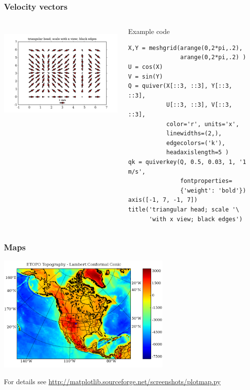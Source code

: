 \documentclass[14pt,compress]{beamer}
\newcounter{time}
\newcommand{\inctime}[1]{\addtocounter{time}{#1}{\tiny \thetime\ m}}
\begin{document}
\begin{frame}[fragile] \frametitle{Velocity vectors}
  \begin{columns}
    \hspace*{-0.5in}
  \includegraphics[height=2in, interpolate=true]{data/quiver}  
    \begin{block}{Example code}
    \tiny
\begin{lstlisting}
X,Y = meshgrid(arange(0,2*pi,.2),
               arange(0,2*pi,.2) )
U = cos(X)
V = sin(Y)
Q = quiver(X[::3, ::3], Y[::3, ::3], 
           U[::3, ::3], V[::3, ::3],
           color='r', units='x', 
           linewidths=(2,), 
           edgecolors=('k'), 
           headaxislength=5 )
qk = quiverkey(Q, 0.5, 0.03, 1, '1 m/s', 
               fontproperties=
               {'weight': 'bold'})
axis([-1, 7, -1, 7])
title('triangular head; scale '\
      'with x view; black edges')
\end{lstlisting}
  \end{block}
\end{columns}
\end{frame}

\begin{frame}[fragile] \frametitle{Maps}
  \includegraphics[height=2.3in, interpolate=true]{data/plotmap}  
  \begin{center}
    \tiny
    For details see \url{http://matplotlib.sourceforge.net/screenshots/plotmap.py}
  \end{center}
\inctime{5}
\end{frame}
\end{document}
